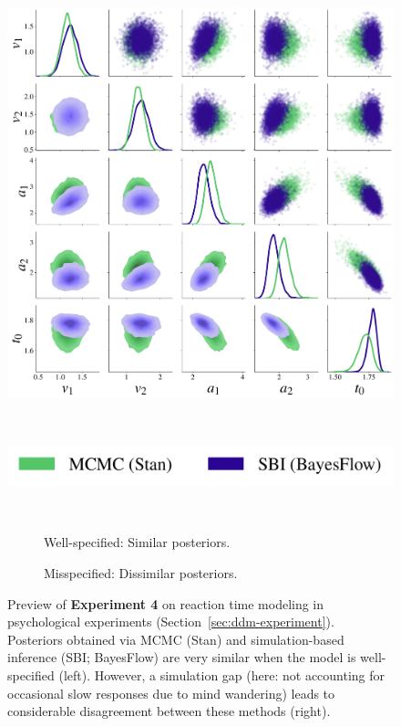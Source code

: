 \documentclass[twoside,11pt]{article}
\newcommand{\numberDDM}{4}
\newcommand{\0}{\boldsymbol{0}}
\begin{document}
\begin{figure}
\begin{minipage}{.40\linewidth}
        \includegraphics[width=\linewidth]{abf_ddm_unbounded_pairplot_stan_bf_slow.pdf}   
    \end{minipage}\\
    \begin{minipage}{.40\linewidth}
        \includegraphics[width=\linewidth]{abf_ddm_unbounded_pairplot_stan_bf_legend_clean.pdf}
    \end{minipage}\\
    \begin{minipage}{.45\linewidth}
        \begin{subfigure}[t]{\linewidth}
            \caption{Well-specified: Similar posteriors.}
            \label{fig:exp:ddm:stan-bf:clean}
        \end{subfigure}
    \end{minipage}
    \hfill
    \begin{minipage}{.45\linewidth}
        \begin{subfigure}[t]{\linewidth}
            \caption{Misspecified: Dissimilar posteriors.}
            \label{fig:exp:ddm:stan-bf:slow}
        \end{subfigure}
    \end{minipage}
    \caption{Preview of \textbf{Experiment \numberDDM} on reaction time modeling in psychological experiments (Section~\ref{sec:ddm-experiment}). Posteriors obtained via MCMC (Stan) and simulation-based inference (SBI; BayesFlow) are very similar when the model is well-specified (left).
    However, a simulation gap (here: not accounting for occasional slow responses due to mind wandering) leads to considerable disagreement between these methods (right).
    }
    \label{fig:exp:ddm:stan-bf}
\end{figure}    
\end{document}
